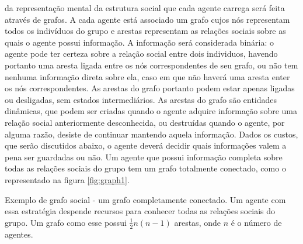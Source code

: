  da representação mental da estrutura social que cada agente carrega será feita através de grafos. A cada agente está associado um grafo cujos nós representam todos os indivíduos do grupo e arestas representam as relações sociais sobre as quais o agente possui informação. A informação será considerada binária: o agente pode ter certeza sobre a relação social entre dois individuos, havendo portanto uma aresta ligada entre os nós correspondentes de seu grafo, ou não tem nenhuma informação direta sobre ela, caso em que não haverá uma aresta enter os nós correspondentes. As arestas do grafo portanto podem estar apenas ligadas ou desligadas, sem estados intermediários. As arestas do grafo são entidades dinâmicas, que podem ser criadas quando o agente adquire informação sobre uma relação social anteriormente desconhecida, ou destruídas quando o agente, por alguma razão, desiste de continuar mantendo aquela informação. Dados os custos, que serão discutidos abaixo, o agente deverá decidir quais informações valem a pena ser guardadas ou não. Um agente que possui informação completa sobre todas as relações sociais do grupo tem um grafo totalmente conectado, como o representado na figura \ref{fig:graph1}. 
\begin{marginfigure}[-45em]
 \caption[Grafo totalmente conectado]{Exemplo de grafo social - um grafo completamente conectado. Um agente com essa estratégia despende recursos para conhecer todas as relações sociais do grupo. Um grafo como esse possui $\frac{1}{2} n(n-1)$ arestas, onde $n$ é o número de agentes.}
 \label{fig:graph1}
 \end{marginfigure}
 

